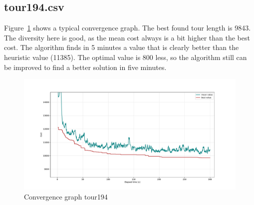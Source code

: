 \documentclass[a4paper,10pt]{article}
\newcommand{\ReplaceMe}[1]{{\color{blue}#1}}
\begin{document}
\subsection{tour194.csv}



Figure~\ref{fig:convergence194} shows a typical convergence graph. The best found tour length is 9843. The diversity here is good, as the mean cost always is a bit higher than the best cost. The algorithm finds in 5 minutes a value that is clearly better than the heuristic value (11385). The optimal value is 800 less, so the algorithm still can be improved to find a better solution in five minutes. 
\begin{figure}[H]
  \centering
  \includegraphics[width=.8\linewidth]{img/convergence194.pdf}
  \caption{Convergence graph tour194}
  \label{fig:convergence194}
\end{figure}
\end{document}
